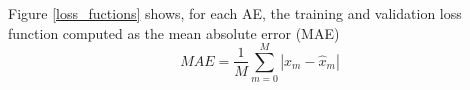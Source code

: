 \documentclass[journal,article,submit,pdftex,moreauthors]{Definitions/mdpi}
\begin{document}
Figure \ref{loss_fuctions} shows, for each AE, the training and validation loss function computed as the mean absolute error (MAE)
\begin{equation}
	MAE = \frac{1}{M}\sum_{m=0}^{M}|x_m - \hat{x}_m|
\end{equation}
\end{document}
